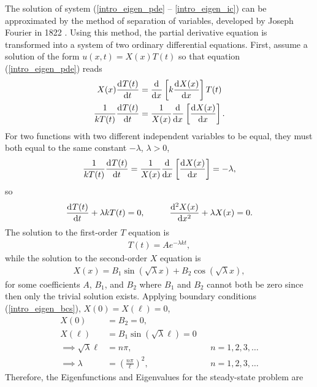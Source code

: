 The solution of system (\ref{intro_eigen_pde} -- \ref{intro_eigen_ic}) can be approximated by the method of separation of variables, developed by Joseph Fourier in 1822 \citep{davis_2013}.  Using this method, the partial derivative equation is transformed into a system of two ordinary differential equations.  First, assume a solution of the form $u(x,t) = X(x)T(t)$ so that equation (\ref{intro_eigen_pde}) reads
\begin{align*}
  X(x)\frac{\mathrm{d}^{} T(t)}{\mathrm{d} t^{} }  &= \frac{\mathrm{d}^{} }{\mathrm{d} x^{} } \left[ k \frac{\mathrm{d}^{} X(x)}{\mathrm{d} x^{} } \right] T(t) \\ 
  \frac{1}{k T(t)}\frac{\mathrm{d}^{} T(t)}{\mathrm{d} t^{} }  &= \frac{1}{X(x)} \frac{\mathrm{d}^{} }{\mathrm{d} x^{} } \left[ \frac{\mathrm{d}^{} X(x)}{\mathrm{d} x^{} } \right].
\end{align*}
For two functions with two different independent variables to be equal, they must both equal to the same constant $-\lambda$, $\lambda > 0$,
\begin{align*}
  \frac{1}{k T(t)}\frac{\mathrm{d}^{} T(t)}{\mathrm{d} t^{} } = \frac{1}{X(x)} \frac{\mathrm{d}^{} }{\mathrm{d} x^{} } \left[ \frac{\mathrm{d}^{} X(x)}{\mathrm{d} x^{} } \right] = - \lambda, 
\end{align*}
so
\begin{align}
  \label{intro_eigen_separated}
  \totder{T(t)}{t} + \lambda k T(t) = 0, \hspace{10mm} \totder[2]{X(x)}{x} + \lambda X(x) = 0.
\end{align}
The solution to the first-order $T$ equation is 
\begin{align}
  \label{intro_eigen_t}
  T(t) = Ae^{-\lambda k t},
\end{align}
while the solution to the second-order $X$ equation is
\begin{align*}
  X(x) = B_1 \sin\left( \sqrt{\lambda} x \right) + B_2 \cos\left( \sqrt{\lambda} x \right),
\end{align*}
for some coefficients $A$, $B_1$, and $B_2$ where $B_1$ and $B_2$ cannot both be zero since then only the trivial solution exists.  Applying boundary conditions (\ref{intro_eigen_bcs}), $X(0) = X(\ell) = 0$,
\begin{align*}
  X(0) &= B_2 = 0, \\
  X(\ell) &= B_1 \sin\left( \sqrt{\lambda} \ell \right) = 0 &&\\
  \implies \sqrt{\lambda} \ell &= n\pi, &&n = 1,2,3,\dots \\
  \implies \lambda &= \left( \frac{n \pi}{\ell} \right)^2, &&n = 1,2,3,\dots
\end{align*}
Therefore, the Eigenfunctions and Eigenvalues for the steady-state problem are
